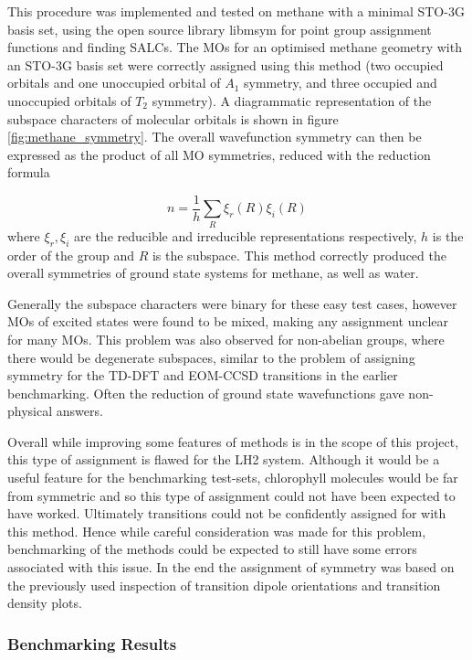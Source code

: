 This procedure was implemented and tested on methane with a minimal STO-3G basis set,
using the open source library libmsym \cite{libmsym} for point group assignment
functions and finding SALCs. The MOs for an optimised methane geometry with an STO-3G 
basis set were correctly assigned using this method (two occupied orbitals and one
unoccupied orbital of $A_1$ symmetry, and three occupied and unoccupied orbitals
of $T_2$ symmetry). A diagrammatic representation of the subspace characters of
molecular orbitals is shown in figure \ref{fig:methane_symmetry}. The overall wavefunction
symmetry can then be expressed as the product of all MO symmetries, reduced with
the reduction formula

\begin{equation}
n = \frac{1}{h} \sum_R \xi_r \left( R \right) \xi_i \left( R \right)
\end{equation}
%
where $\xi_r, \xi_i$ are the reducible and irreducible representations respectively,
$h$ is the order of the group and $R$ is the subspace. This method correctly produced
the overall symmetries of ground state systems for methane, as well as water.

Generally the subspace characters were binary for these easy test cases, however 
MOs of excited states were found to be mixed, making any assignment unclear for
many MOs. This problem was also observed for non-abelian groups, where there would 
be degenerate subspaces, similar to the problem of assigning symmetry for the TD-DFT 
and EOM-CCSD transitions in the earlier benchmarking. Often the reduction of ground
state wavefunctions gave non-physical answers.

Overall while improving some features of \dscf methods is in the scope of this project,
this type of assignment is flawed for the LH2 system. Although it would be a useful 
feature for the benchmarking test-sets, chlorophyll molecules would be far from
symmetric and so this type of assignment could not have been expected to have worked.
Ultimately transitions could not be confidently assigned for \dscf with this method.
Hence while careful consideration was made for this problem, benchmarking of the
\dxtb methods could be expected to still have some errors associated with this issue.
In the end the assignment of symmetry was based on the previously used inspection
of transition dipole orientations and transition density plots.

\subsubsection{\dxtb Benchmarking Results}
\label{subsubsec:imp_of_benchmarking}

